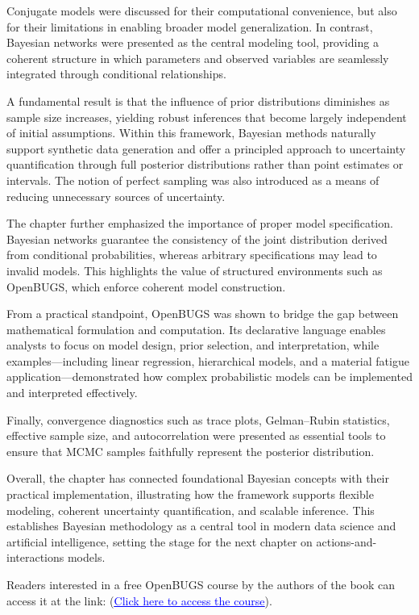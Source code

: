 Conjugate models were discussed for their computational convenience, but also for their limitations in enabling broader model generalization. In contrast, Bayesian networks were presented as the central modeling tool, providing a coherent structure in which parameters and observed variables are seamlessly integrated through conditional relationships.

A fundamental result is that the influence of prior distributions diminishes as sample size increases, yielding robust inferences that become largely independent of initial assumptions. Within this framework, Bayesian methods naturally support synthetic data generation and offer a principled approach to uncertainty quantification through full posterior distributions rather than point estimates or intervals. The notion of perfect sampling was also introduced as a means of reducing unnecessary sources of uncertainty.

The chapter further emphasized the importance of proper model specification. Bayesian networks guarantee the consistency of the joint distribution derived from conditional probabilities, whereas arbitrary specifications may lead to invalid models. This highlights the value of structured environments such as OpenBUGS, which enforce coherent model construction.

From a practical standpoint, OpenBUGS was shown to bridge the gap between mathematical formulation and computation. Its declarative language enables analysts to focus on model design, prior selection, and interpretation, while examples—including linear regression, hierarchical models, and a material fatigue application—demonstrated how complex probabilistic models can be implemented and interpreted effectively.

Finally, convergence diagnostics such as trace plots, Gelman–Rubin statistics, effective sample size, and autocorrelation were presented as essential tools to ensure that MCMC samples faithfully represent the posterior distribution.

Overall, the chapter has connected foundational Bayesian concepts with their practical implementation, illustrating how the framework supports flexible modeling, coherent uncertainty quantification, and scalable inference. This establishes Bayesian methodology as a central tool in modern data science and artificial intelligence, setting the stage for the next chapter on actions-and-interactions models. 

Readers interested in a free OpenBUGS course by the authors of the book can access it at the link:
(\href{https://www.uclm.es/conocimiento/cursos/bayesian-methods-openbugs-en}{\textcolor{blue}{\underline{Click here to access the course}}}). 